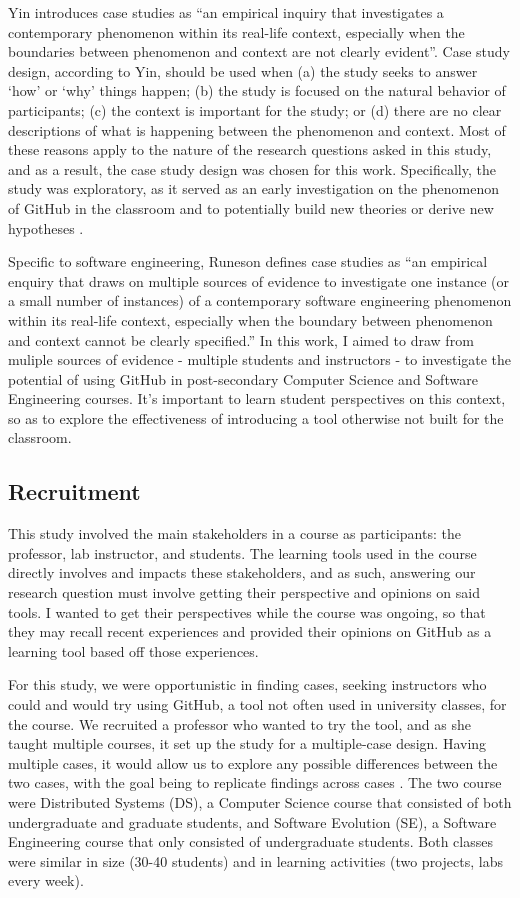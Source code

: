 Yin \cite{yin2013case} introduces case studies as ``an empirical inquiry that investigates a contemporary phenomenon within its real-life context, especially when the boundaries between phenomenon and context are not clearly evident''. Case study design, according to Yin, should be used when (a) the study seeks to answer `how' or `why' things happen; (b) the study is focused on the natural behavior of participants; (c) the context is important for the study; or (d) there are no clear descriptions of what is happening between the phenomenon and context. Most of these reasons apply to the nature of the research questions asked in this study, and as a result, the case study design was chosen for this work. Specifically, the study was exploratory, as it served as an early investigation on the phenomenon of GitHub in the classroom and to potentially build new theories or derive new hypotheses \cite{easterbrook2008selecting}.

Specific to software engineering, Runeson \cite{runeson2012case} defines case studies as ``an empirical enquiry that draws on multiple sources of evidence to investigate one instance (or a small number of instances) of a contemporary software engineering phenomenon within its real-life context, especially when the boundary between phenomenon and context cannot be clearly specified.'' In this work, I aimed to draw from muliple sources of evidence - multiple students and instructors - to investigate the potential of using GitHub in post-secondary Computer Science and Software Engineering courses. It's important to learn student perspectives on this context, so as to explore the effectiveness of introducing a tool otherwise not built for the classroom.

\subsection{Recruitment}
This study involved the main stakeholders in a course as participants: the professor, lab instructor, and students. The learning tools used in the course directly involves and impacts these stakeholders, and as such, answering our research question must involve getting their perspective and opinions on said tools. I wanted to get their perspectives while the course was ongoing, so that they may recall recent experiences and provided their opinions on GitHub as a learning tool based off those experiences.

For this study, we were opportunistic in finding cases, seeking instructors who could and would try using GitHub, a tool not often used in university classes, for the course. We recruited a professor who wanted to try the tool, and as she taught multiple courses, it set up the study for a multiple-case design. Having multiple cases, it would allow us to explore any possible differences between the two cases, with the goal being to replicate findings across cases \cite{yin2013case}. The two course were Distributed Systems (DS), a Computer Science course that consisted of both undergraduate and graduate students, and Software Evolution (SE), a Software Engineering course that only consisted of undergraduate students. Both classes were similar in size (30-40 students) and in learning activities (two projects, labs every week).

